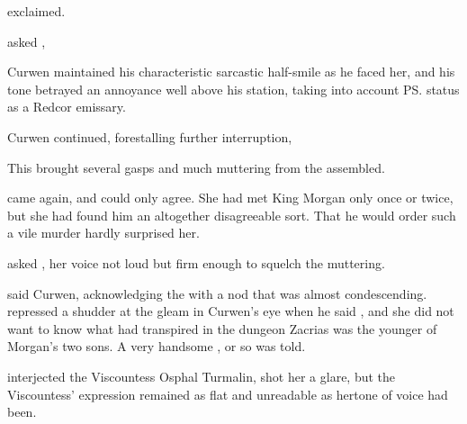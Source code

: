  \Dornaer{} exclaimed. 

 asked \Vincerre, 

Curwen maintained his characteristic sarcastic half-smile as he faced her, and his tone betrayed an annoyance well above his station, taking into account \ps{\Vincerre} status as a Redcor emissary. 

 Curwen continued, forestalling further interruption, 

This brought several gasps and much muttering from the assembled. 

 came \Dornaer{} again, and \Tiroco{} could only agree. She had met King Morgan only once or twice, but she had found him an altogether disagreeable sort. That he would order such a vile murder hardly surprised her. 

 asked \Vincerre, her voice not loud but firm enough to squelch the muttering. 


 said Curwen, acknowledging the \mater{} with a nod that was almost condescending. 
%
\dash%
\Tiroco{} repressed a shudder at the gleam in Curwen's eye when he said , and she did not want to know what had transpired in the dungeon%
\dash%
Zacrias was the younger of Morgan's two sons. A very handsome \human, or so \Tiroco{} was told. 


 interjected the Viscountess Osphal Turmalin, 
\Tiroco{} shot her a glare, but the Viscountess' expression remained as flat and unreadable as hertone of voice had been.

